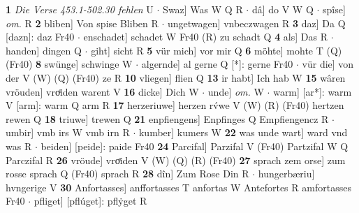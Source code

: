 \documentclass[8pt,a4paper,notitlepage]{article}
\begin{document}
\begin{table}[ht]
\begin{minipage}[t]{0.5\linewidth}
\textbf{1} \textit{Die Verse 453.1-502.30 fehlen} U   $\cdot$ Swaz] Was W Q R  $\cdot$ dâ] do V W Q  $\cdot$ spîse] \textit{om.} R \textbf{2} bliben] Von spise Bliben R  $\cdot$ ungetwagen] vnbeczwagen R \textbf{3} daz] Da Q [dazn]: daz Fr40  $\cdot$ enschadet] schadet W Fr40 (R) zu schadt Q \textbf{4} als] Das R  $\cdot$ handen] dingen Q  $\cdot$ giht] sicht R \textbf{5} vür mich] vor mir Q \textbf{6} möhte] mohte T (Q) (Fr40) \textbf{8} swünge] schwinge W  $\cdot$ algernde] al gerne Q [*]: gerne Fr40  $\cdot$ vür die] von der V (W) (Q) (Fr40) ze R \textbf{10} vliegen] flien Q \textbf{13} ir habt] Ich hab W \textbf{15} wâren vröuden] vroͤiden warent V \textbf{16} dicke] Dich W  $\cdot$ unde] \textit{om.} W  $\cdot$ warm] [ar*]: warm V [arm]: warm Q arm R \textbf{17} herzeriuwe] herzen rv́we V (W) (R) (Fr40) hertzen rewen Q \textbf{18} triuwe] trewen Q \textbf{21} enpfiengens] Enpfinges Q Empfiengencz R  $\cdot$ umbir] vmb irs W vmb irn R  $\cdot$ kumber] kumers W \textbf{22} was unde wart] ward vnd was R  $\cdot$ beiden] [peide]: paide Fr40 \textbf{24} Parcifal] Parzifal V (Fr40) Partzifal W Q Parczifal R \textbf{26} vröude] vroͤiden V (W) (Q) (R) (Fr40) \textbf{27} sprach zem orse] zum rosse sprach Q (Fr40) sprach R \textbf{28} dîn] Zum Rose Din R  $\cdot$ hungerbæriu] hvngerige V \textbf{30} Anfortasses] anffortasses T anfortas W Antefortes R amfortasses Fr40  $\cdot$ pfliget] [pflúget]: pflẏget R \newline
\end{minipage}
\end{table}
\end{document}
